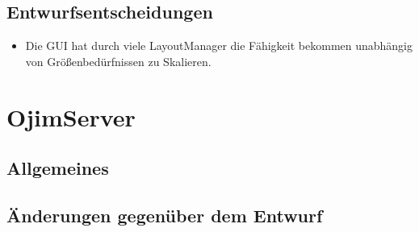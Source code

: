 \documentclass[a4paper,10pt]{article}
\begin{document}
\subsection{Entwurfsentscheidungen}
\begin{itemize}
\item Die GUI hat durch viele LayoutManager die Fähigkeit bekommen unabhängig von Größenbedürfnissen zu Skalieren.
\end{itemize}
\newpage
\section{OjimServer}
\subsection{Allgemeines}
\subsection {Änderungen gegenüber dem Entwurf}
\end{document}
